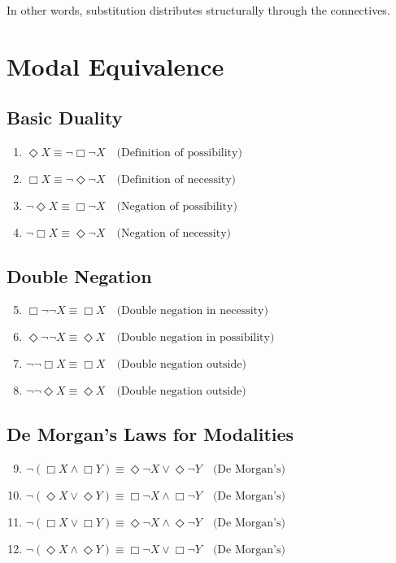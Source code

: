 \documentclass[12pt,a4paper,openany]{article}
\begin{document}
In other words, substitution distributes structurally through the connectives.

\section{Modal Equivalence}

\subsection{Basic Duality}
\begin{enumerate}
\item $\Diamond X \equiv \neg \Box \neg X \quad \text{(Definition of possibility)}$
\item $\Box X \equiv \neg \Diamond \neg X \quad \text{(Definition of necessity)}$
\item $\neg \Diamond X \equiv \Box \neg X \quad \text{(Negation of possibility)}$
\item $\neg \Box X \equiv \Diamond \neg X \quad \text{(Negation of necessity)}$
\end{enumerate}

\subsection{Double Negation}
\begin{enumerate}
\setcounter{enumi}{4}
\item $\Box \neg \neg X \equiv \Box X \quad \text{(Double negation in necessity)}$
\item $\Diamond \neg \neg X \equiv \Diamond X \quad \text{(Double negation in possibility)}$
\item $\neg \neg \Box X \equiv \Box X \quad \text{(Double negation outside)}$
\item $\neg \neg \Diamond X \equiv \Diamond X \quad \text{(Double negation outside)}$
\end{enumerate}

\subsection{De Morgan's Laws for Modalities}
\begin{enumerate}
\setcounter{enumi}{8}
\item $\neg(\Box X \land \Box Y) \equiv \Diamond \neg X \lor \Diamond \neg Y \quad \text{(De Morgan's)}$
\item $\neg(\Diamond X \lor \Diamond Y) \equiv \Box \neg X \land \Box \neg Y \quad \text{(De Morgan's)}$
\item $\neg(\Box X \lor \Box Y) \equiv \Diamond \neg X \land \Diamond \neg Y \quad \text{(De Morgan's)}$
\item $\neg(\Diamond X \land \Diamond Y) \equiv \Box \neg X \lor \Box \neg Y \quad \text{(De Morgan's)}$
\end{enumerate}
\end{document}
